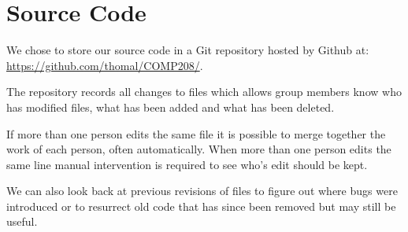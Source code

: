 \section{Source Code}

We chose to store our source code in a Git repository hosted by Github at: \url{https://github.com/thomal/COMP208/}. \par

The repository records all changes to files which allows group members know who has modified files, 
what has been added and what has been deleted. \par

If more than one person edits the same file it is possible to merge together the work
of each person, often automatically. When more than one person edits the same line
manual intervention is required to see who's edit should be kept. \par

We can also look back at previous revisions of files to figure out where bugs were introduced or to resurrect old
code that has since been removed but may still be useful.
